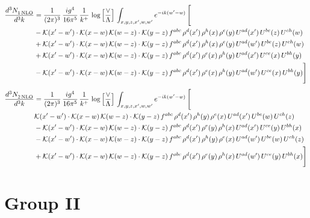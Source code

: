 \documentclass[9pt]{article}
\numberwithin{equation}{section}
\begin{document}
\begin{align}
    \frac{d^{3}N_{1\,\rm NLO}^{\rm}}{d^{3}k}  & = \frac{1}{(2\pi)^{3}}\, \frac{ig^{4}}{16\pi^{5}}\, \frac{1}{k^{+}}\, \log{\left[\frac{\vee}{\Lambda}\right]}\, \int_{x,y,z,x^{\prime},w,w^{\prime}}e^{-ik(w^{\prime}-w)}\, \Bigg[\notag \\ & -\mathcal{K}(x'-w')\cdot \mathcal{K}(x-w)\, \mathcal{K}(w-z)\cdot \mathcal{K}(y-z)\,f^{abc}\,\rho^{d}(x')\,\rho^{h}(x)\,\rho^{e}(y)\,U^{ad}(x')\,U^{be}(z)\,U^{ch}(w)\notag \\ & + \mathcal{K}(x'-w')\cdot \mathcal{K}(x-w)\, \mathcal{K}(w-z)\cdot \mathcal{K}(y-z)\,f^{abc}\,\rho^{d}(x')\,\rho^{h}(x)\,\rho^{e}(y)\,U^{ad}(w')\,U^{be}(z)\,U^{ch}(w)\notag \\ & +\mathcal{K}(x'-w')\cdot \mathcal{K}(x-w)\, \mathcal{K}(w-z)\cdot \mathcal{K}(y-z)\,f^{abc}\,\rho^{d}(x')\,\rho^{e}(x)\,\rho^{h}(y)\,U^{ad}(x')\,U^{ce}(x)\,U^{bh}(y)\notag \\ & -\mathcal{K}(x'-w')\cdot \mathcal{K}(x-w)\, \mathcal{K}(w-z)\cdot \mathcal{K}(y-z)\,f^{abc}\,\rho^{d}(x')\,\rho^{e}(x)\,\rho^{h}(y)\,U^{ad}(w')\,U^{ce}(x)\,U^{bh}(y) \Bigg]
\end{align}
\begin{align}
    \frac{d^{3}N_{2\,\rm NLO}^{\rm}}{d^{3}k}  & = \frac{1}{(2\pi)^{3}}\, \frac{ig^{4}}{16\pi^{5}}\, \frac{1}{k^{+}}\, \log{\left[\frac{\vee}{\Lambda}\right]}\, \int_{x,y,z,x^{\prime},w,w^{\prime}}e^{-ik(w^{\prime}-w)}\, \Bigg[\notag \\ & \mathcal{K}(x'-w')\cdot \mathcal{K}(x-w)\, \mathcal{K}(w-z)\cdot \mathcal{K}(y-z)\,f^{abc}\,\rho^{d}(x')\,\rho^{h}(y)\,\rho^{e}(x)\,U^{ad}(x')\,U^{be}(w)\,U^{ch}(z)\notag \\ & - \mathcal{K}(x'-w')\cdot \mathcal{K}(x-w)\, \mathcal{K}(w-z)\cdot \mathcal{K}(y-z)\,f^{abc}\,\rho^{d}(x')\,\rho^{e}(y)\,\rho^{h}(x)\,U^{ad}(x')\,U^{ce}(y)\,U^{bh}(x)\notag \\ & -\mathcal{K}(x'-w')\cdot \mathcal{K}(x-w)\, \mathcal{K}(w-z)\cdot \mathcal{K}(y-z)\,f^{abc}\,\rho^{d}(x')\,\rho^{h}(y)\,\rho^{e}(x)\,U^{ad}(w')\,U^{be}(w)\,U^{ch}(z)\,\notag \\ & + \mathcal{K}(x'-w')\cdot \mathcal{K}(x-w)\, \mathcal{K}(w-z)\cdot \mathcal{K}(y-z)\,f^{abc}\,\rho^{d}(x')\,\rho^{e}(y)\,\rho^{h}(x)\,U^{ad}(w')\,U^{ce}(y)\,U^{bh}(x) \Bigg]
\end{align}
\section{Group II}
\end{document}
